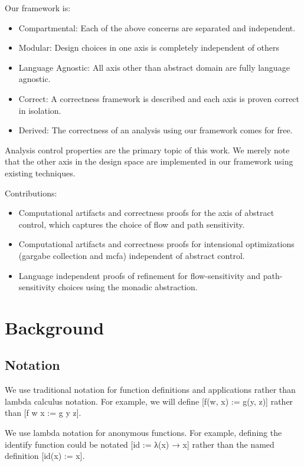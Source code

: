 \documentclass{article}
\begin{document}
Our framework is:
%
\begin{itemize}
\item Compartmental: Each of the above concerns are separated and independent.
\item Modular: Design choices in one axis is completely independent of others
\item Language Agnostic: All axis other than abstract domain are fully language agnostic.
\item Correct: A correctness framework is described and each axis is proven correct in isolation.
\item Derived: The correctness of an analysis using our framework comes for free.
\end{itemize}


Analysis control properties are the primary topic of this work.
%
We merely note that the other axis in the design space are implemented in our framework using existing techniques.


Contributions:
%
\begin{itemize}
\item Computational artifacts and correctness proofs for the axis of abstract control, which captures the choice of flow and path sensitivity.
\item Computational artifacts and correctness proofs for intensional optimizations (gargabe collection and mcfa) independent of abstract control.
\item Language independent proofs of refinement for flow-sensitivity and path-sensitivity choices using the monadic abstraction.
\end{itemize}
 

\section{Background}
\label{section:Background}
 
\subsection{Notation}
\label{section:Background:Notation}


We use traditional notation for function definitions and applications rather than lambda calculus notation.
%
For example, we will define [f(w, x) := g(y, z)] rather than [f w x := g y z].


We use lambda notation for anonymous functions.
%
For example, defining the identify function could be notated [id := λ(x) → x] rather than the named definition [id(x) := x].
\end{document}
